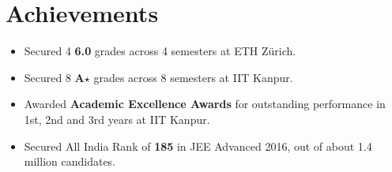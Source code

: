 %

\section*{Achievements}
\begin{itemize}[leftmargin=*,itemsep=0mm,label={\footnotesize\textbullet}]

\item Secured 4 \textbf{6.0} grades across 4 semesters at ETH Zürich.
\item Secured 8 \textbf{A$\star$} grades across 8 semesters at IIT Kanpur.
\item Awarded \textbf{Academic Excellence Awards} for outstanding performance in 1st, 2nd and 3rd years at IIT Kanpur.
\item Secured All India Rank of \textbf{185} in JEE Advanced 2016, out of about 1.4 million candidates.

\end{itemize}
